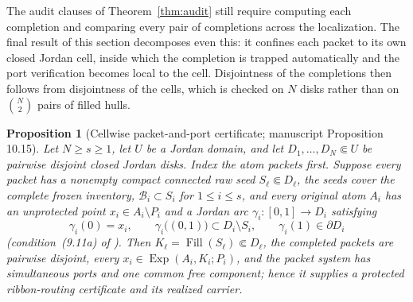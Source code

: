 \documentclass[11pt,reqno]{amsart}
\newtheorem{proposition}[theorem]{Proposition}
\theoremstyle{definition}
\theoremstyle{remark}
\newcommand{\Fill}{\operatorname{Fill}}
\newcommand{\Exp}{\operatorname{Exp}}
\begin{document}
The audit clauses of Theorem~\ref{thm:audit} still require computing each completion
and comparing every pair of completions across the localization. The final result of
this section decomposes even this: it confines each packet to its own closed Jordan
cell, inside which the completion is trapped automatically and the port verification
becomes local to the cell. Disjointness of the completions then follows from
disjointness of the cells, which is checked on $N$ disks rather than on
$\binom N2$ pairs of filled hulls.

\begin{proposition}[Cellwise packet-and-port certificate; manuscript Proposition
10.15]\label{prop:cellwise}
Let $N\ge s\ge1$, let $U$ be a Jordan domain, and let
$D_1,\dots,D_N\Subset U$ be pairwise disjoint
closed Jordan disks.  Index the atom packets first.  Suppose every packet
has a nonempty compact connected raw seed
$S_\ell\Subset D_\ell$, the seeds cover the complete frozen inventory,
$\mathcal B_i\subset S_i$ for $1\le i\le s$, and every original atom $A_i$ has an
unprotected point $x_i\in A_i\setminus P_i$
and a Jordan arc $\gamma_i\colon[0,1]\to D_i$ satisfying
\begin{equation}\label{eq:E-arc-condition}
\gamma_i(0)=x_i,
\qquad
\gamma_i\bigl((0,1)\bigr)\subset D_i\setminus S_i,
\qquad
\gamma_i(1)\in\partial D_i
\end{equation}
(condition~(9.11a) of \cite{MWman}). Then $K_\ell=\Fill(S_\ell)\Subset D_\ell$, the
completed packets are pairwise disjoint, every $x_i\in\Exp(A_i,K_i;P_i)$, and the
packet system has simultaneous ports and one common free component; hence
it supplies a protected ribbon-routing certificate and its realized
carrier.
\end{proposition}
\end{document}
